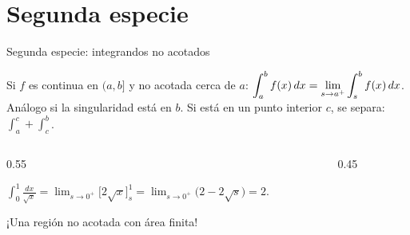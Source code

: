 \documentclass[10pt,aspectratio=169]{beamer}
\begin{document}
\section{Segunda especie}

\begin{frame}{Segunda especie: integrandos no acotados}
  \begin{definicion}
    Si $f$ es continua en $(a,b]$ y no acotada cerca de $a$:\qquad
    $\displaystyle\int_a^bf(x)\,dx=\lim_{s\to a^+}\int_s^bf(x)\,dx$.\\
    Análogo si la singularidad está en $b$. Si está en un punto interior $c$, se separa: $\int_a^c+\int_c^b$.
  \end{definicion}
  \begin{columns}
    \begin{column}{0.55\textwidth}
      \begin{ejemplo}[6]
        $\displaystyle\int_0^1\frac{dx}{\sqrt x}=\lim_{s\to0^+}\Big[2\sqrt x\Big]_s^1=\lim_{s\to0^+}\big(2-2\sqrt s\big)=2.$
      \end{ejemplo}
      \small ¡Una región no acotada con área finita!
    \end{column}
    \begin{column}{0.45\textwidth}
      \centering
    \end{column}
  \end{columns}
\end{frame}
\end{document}
